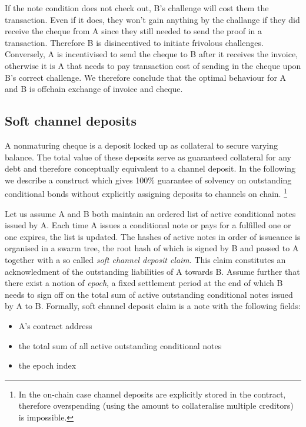 \documentclass[a4paper,10pt]{article}
\newcommand\gloss[1]{\emph{\gls{#1}}}
\begin{document}
If the note condition does not check out, B's challenge will cost them the transaction.
Even if it does, they won't gain anything by the challange if they did receive the
cheque from A since they still needed to send the proof in a transaction.
Therefore B is disincentived to initiate frivolous challenges.
Conversely, A is incentivised to send the cheque to B after it receives the invoice,
otherwise it is A that needs to pay transaction cost of sending in the cheque upon B's correct challenge.
We therefore conclude that the optimal behaviour for A and B is offchain exchange of invoice and cheque.

\subsection{Soft channel deposits}
A nonmaturing cheque is a deposit locked up as collateral to secure varying balance.
The total value of these deposits serve as guaranteed collateral for any debt and
therefore conceptually equivalent to a channel deposit.
In the following we describe a construct which gives 100$\%$ guarantee of solvency
on outstanding conditional bonds without explicitly assigning deposits to channels on chain.%
%
\footnote{In the on-chain case channel deposits are explicitly stored in the contract, therefore overspending
(using the amount to collateralise multiple creditors) is impossible.}

Let us assume A and B both maintain an ordered list of active conditional notes issued by A.
Each time A issues a conditional note or pays for a fulfilled one or one expires, the list is updated.
The hashes of active notes in order of issueance is organised in a swarm tree, the
root hash of which is signed by B and passed to A together with a so called
\gloss{soft channel deposit claim}. This claim constitutes an acknowledment of
the outstanding liabilities of A towards B. Assume further that there exist a notion of \gloss{epoch},
a fixed settlement period at the end of which B needs to sign off on the total sum of active
outstanding conditional notes issued by A to B.
Formally, soft channel deposit claim is a note with the following fields:

\begin{itemize}
  \item A's contract address
  \item the total sum of all active outstanding conditional notes
  \item the epoch index
\end{itemize}
\end{document}

